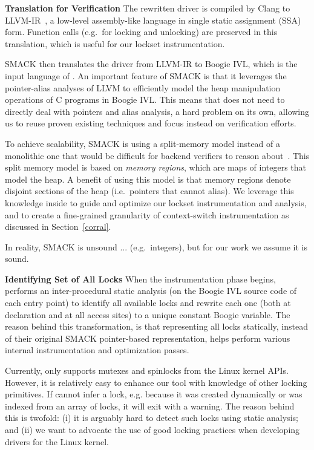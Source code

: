 \medskip\noindent\textbf{Translation for Verification }
%
The rewritten driver is compiled by Clang to LLVM-IR~\cite{lattner2004llvm}, a low-level assembly-like language in single static assignment (SSA) form. Function calls (e.g.\ for locking and unlocking) are preserved in this translation, which is useful for our lockset instrumentation.

SMACK then translates the driver from LLVM-IR to Boogie IVL, which is the input language of \whoop. An important feature of SMACK is that it leverages the pointer-alias analyses of LLVM to efficiently model the heap manipulation operations of C programs in Boogie IVL. This means that \whoop does not need to directly deal with pointers and alias analysis, a hard problem on its own, allowing us to reuse proven existing techniques and focus instead on verification efforts.

To achieve scalability, SMACK is using a split-memory model instead of a monolithic one that would be difficult for backend verifiers to reason about~\cite{rakamaric2009scalable}. This split memory model is based on \emph{memory regions}, which are maps of integers that model the heap. A benefit of using this model is that memory regions denote disjoint sections of the heap (i.e.\ pointers that cannot alias). We leverage this knowledge inside \whoop to guide and optimize our lockset instrumentation and analysis, and to create a fine-grained granularity of context-switch instrumentation as discussed in Section~\ref{corral}.

In reality, SMACK is unsound ... (e.g.\ integers), but for our work we assume it is sound.

\medskip\noindent\textbf{Identifying Set of All Locks }
%
When the instrumentation phase begins, \whoop performs an inter-procedural static analysis (on the Boogie IVL source code of each entry point) to identify all available locks and rewrite each one (both at declaration and at all access sites) to a unique constant Boogie variable. The reason behind this transformation, is that representing all locks statically, instead of their original SMACK pointer-based representation, helps \whoop perform various internal instrumentation and optimization passes.

Currently, \whoop only supports mutexes and spinlocks from the Linux kernel APIs. However, it is relatively easy to enhance our tool with knowledge of other locking primitives. If \whoop cannot infer a lock, e.g. because it was created dynamically or was indexed from an array of locks, it will exit with a warning. The reason behind this is twofold: (i) it is arguably hard to detect such locks using static analysis; and (ii) we want to advocate the use of good locking practices when developing drivers for the Linux kernel.

